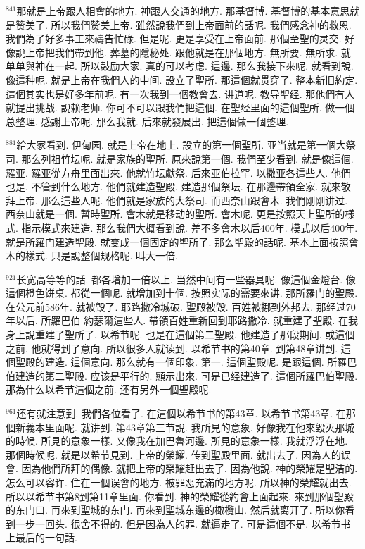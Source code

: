 \documentclass{book}
\begin{document}
$^{841}$那就是上帝跟人相會的地方.
神跟人交通的地方.
那基督博.
基督博的基本意思就是赞美了.
所以我們赞美上帝.
雖然說我們到上帝面前的話呢.
我們感念神的救恩.
我們為了好多事工來禱告忙碌.
但是呢.
更是享受在上帝面前.
那個至聖的灵交.
好像說上帝把我們帶到他.
葬墓的隱秘处.
跟他就是在那個地方.
無所要.
無所求.
就单单與神在一起.
所以鼓励大家.
真的可以考虑.
這邊.
那么我接下來呢.
就看到說.
像這种呢.
就是上帝在我們人的中间.
設立了聖所.
那這個就贯穿了.
整本新旧約定.
這個其实也是好多年前呢.
有一次我到一個教會去.
讲道呢.
教导聖经.
那他們有人就提出挑战.
說赖老师.
你可不可以跟我們把這個.
在聖经里面的這個聖所.
做一個总整理.
感謝上帝呢.
那么我就.
后來就發展出.
把這個做一個整理.

$^{881}$給大家看到.
伊甸园.
就是上帝在地上.
設立的第一個聖所.
亚当就是第一個大祭司.
那么列祖竹坛呢.
就是家族的聖所.
原來說第一個.
我們至少看到.
就是像這個.
羅亚.
羅亚從方舟里面出來.
他就竹坛獻祭.
后來亚伯拉罕.
以撒亚各這些人.
他們也是.
不管到什么地方.
他們就建造聖殿.
建造那個祭坛.
在那邊帶領全家.
就來敬拜上帝.
那么這些人呢.
他們就是家族的大祭司.
而西奈山跟會木.
我們刚刚讲过.
西奈山就是一個.
暂時聖所.
會木就是移动的聖所.
會木呢.
更是按照天上聖所的樣式.
指示模式來建造.
那么我們大概看到說.
差不多會木以后400年.
模式以后400年.
就是所羅门建造聖殿.
就变成一個固定的聖所了.
那么聖殿的話呢.
基本上面按照會木的樣式.
只是說整個规格呢.
叫大一倍.

$^{921}$长宽高等等的話.
都各增加一倍以上.
当然中间有一些器具呢.
像這個金燈台.
像這個橙色饼桌.
都從一個呢.
就增加到十個.
按照实际的需要來讲.
那所羅门的聖殿.
在公元前586年.
就被毀了.
耶路撒冷城破.
聖殿被毀.
百姓被挪到外邦去.
那经过70年以后.
所羅巴伯 約瑟爾這些人.
帶領百姓重新回到耶路撒冷.
就重建了聖殿.
在我身上說重建了聖所了.
以希节呢.
也是在這個第二聖殿.
他建造了那段期间.
或這個之前.
他就得到了意向.
所以很多人就读到.
以希节书的第40章.
到第48章讲到.
這個聖殿的建造.
這個意向.
那么就有一個印象.
第一.
這個聖殿呢.
是跟這個.
所羅巴伯建造的第二聖殿.
应该是平行的.
顯示出來.
可是已经建造了.
這個所羅巴伯聖殿.
那為什么以希节這個之前.
还有另外一個聖殿呢.

$^{961}$还有就注意到.
我們各位看了.
在這個以希节书的第43章.
以希节书第43章.
在那個新義本里面呢.
就讲到.
第43章第三节說.
我所見的意象.
好像我在他來毀灭那城的時候.
所見的意象一樣.
又像我在加巴魯河邊.
所見的意象一樣.
我就浮浮在地.
那個時候呢.
就是以希节見到.
上帝的榮耀.
传到聖殿里面.
就出去了.
因為人的误會.
因為他們所拜的偶像.
就把上帝的榮耀赶出去了.
因為他說.
神的榮耀是聖洁的.
怎么可以容许.
住在一個误會的地方.
被罪恶充滿的地方呢.
所以神的榮耀就出去.
所以以希节书第8到第11章里面.
你看到.
神的榮耀從約會上面起來.
來到那個聖殿的东门口.
再來到聖城的东门.
再來到聖城东邊的橄欖山.
然后就离开了.
所以你看到一步一回头.
很舍不得的.
但是因為人的罪.
就逼走了.
可是這個不是.
以希节书上最后的一句話.
\end{document}
